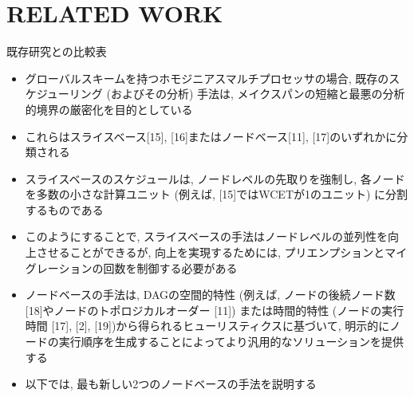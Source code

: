 
\section{RELATED WORK}
\label{sec: rw}

\begin{frame}{既存研究との比較表}
\end{frame}

\begin{frame}{}
    \begin{itemize}
        \item グローバルスキームを持つホモジニアスマルチプロセッサの場合, 既存のスケジューリング (およびその分析) 手法は, メイクスパンの短縮と最悪の分析的境界の厳密化を目的としている
        \item これらはスライスベース[15], [16]またはノードベース[11], [17]のいずれかに分類される
        \item スライスベースのスケジュールは, ノードレベルの先取りを強制し, 各ノードを多数の小さな計算ユニット (例えば, [15]ではWCETが1のユニット) に分割するものである
        \item このようにすることで, スライスベースの手法はノードレベルの並列性を向上させることができるが, 向上を実現するためには, プリエンプションとマイグレーションの回数を制御する必要がある
    \end{itemize}
\end{frame}

\begin{frame}{}
    \begin{itemize}
        \item ノードベースの手法は, DAGの空間的特性 (例えば, ノードの後続ノード数 [18]やノードのトポロジカルオーダー [11]) または時間的特性 (ノードの実行時間 [17], [2], [19])から得られるヒューリスティクスに基づいて, 明示的にノードの実行順序を生成することによってより汎用的なソリューションを提供する
        \item 以下では, 最も新しい2つのノードベースの手法を説明する
    \end{itemize}
\end{frame}


